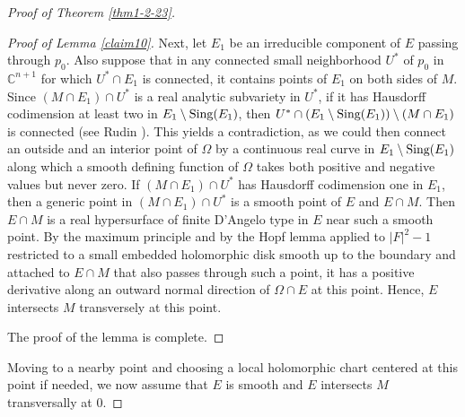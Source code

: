 \documentclass[a4paper,centertags,oneside,12pt]{amsart}
\newcommand{\CC}{\mathbb C}
\numberwithin{equation}{section}
\begin{document}
\begin{proof}[Proof of Theorem \ref{thm1-2-23}]
\begin{proof}[Proof of Lemma \ref{claim10}]
Next, let $E_1$ be an irreducible component of $E$ passing through  $p_0$. Also suppose that in any connected small neighborhood  $U^*$ of  $p_0$  in $\CC^{n+1}$ for which  $U^*\cap E_1$ is connected, it contains points of $E_1$ on both sides of $M$.
Since  $(M\cap E_1)\cap U^*$ is a real analytic subvariety in $U^*$, if it has Hausdorff codimension at least  two in $E_1\setminus \hbox{Sing}(E_1)$, then $U^*\cap (E_1\setminus \hbox{Sing}(E_1)) \setminus (M\cap E_1)$ is connected (see Rudin \cite[Chapter 14]{Ru80}). This yields a contradiction, as we could then connect an outside and an interior  point of $\Omega$ by a  continuous real curve in $E_1\setminus \hbox{Sing}(E_1)$  along which a smooth defining function of $\Omega$ takes both positive and negative values but never zero.
 If $(M\cap E_1)\cap U^*$ has Hausdorff codimension one in $E_1$, then a generic point in $(M\cap E_1)\cap U^*$ is  a smooth point of $E$ and $E\cap M$. Then $E\cap M$ is a real hypersurface of finite D'Angelo type  in $E$ near such a smooth point. By the maximum principle and by  the  Hopf lemma applied  to   $|F|^2-1$ restricted to a small embedded holomorphic disk smooth up to the boundary and  attached to $E\cap M$ that also passes  through such a point,  it   has a positive   derivative along an outward normal direction of $\Omega\cap E$ at this  point. Hence, $E$ intersects $M$ transversely  at this  point.  

 
 
 The proof of the  lemma is complete.
 \end{proof}

Moving to a nearby point and choosing a local holomorphic chart centered at this point if needed, we now assume that $E$ is smooth and $E$ intersects $M$ transversally  at $0$.


\end{proof}
\end{document}
